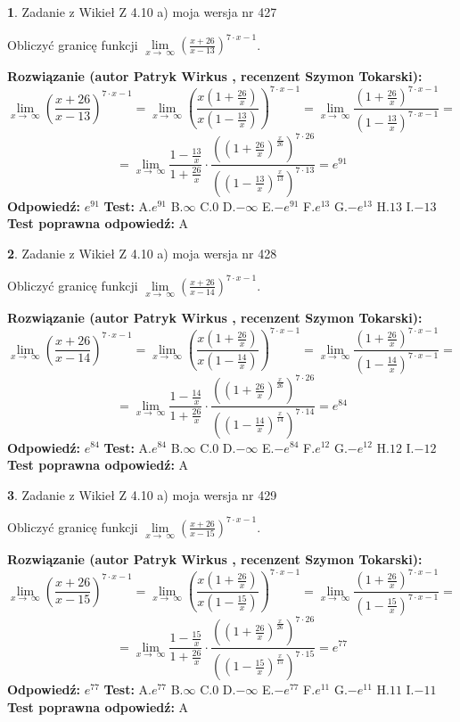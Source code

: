 \documentclass[12pt, a4paper]{article}
\theoremstyle{definition} %
\newtheorem{zad}{}
\newcommand{\zadStart}[1]{\begin{zad}#1\newline}
\newcommand{\zadStop}{\end{zad}}
\newcommand{\rozwStart}[2]{\noindent \textbf{Rozwiązanie (autor #1 , recenzent #2): }\newline}
\newcommand{\rozwStop}{\newline}
\newcommand{\odpStart}{\noindent \textbf{Odpowiedź:}\newline}
\newcommand{\odpStop}{\newline}
\newcommand{\testStart}{\noindent \textbf{Test:}\newline}
\newcommand{\testStop}{\newline}
\newcommand{\kluczStart}{\noindent \textbf{Test poprawna odpowiedź:}\newline}
\newcommand{\kluczStop}{\newline}
\begin{document}
\zadStart{Zadanie z Wikieł Z 4.10 a) moja wersja nr 427}

Obliczyć granicę funkcji  $\lim\limits_{x\to\ \infty}(\frac{x+26}{x-13})^{7\cdot x-1}$.
\zadStop
\rozwStart{Patryk Wirkus}{Szymon Tokarski}
$$\lim\limits_{x\to\ \infty}(\frac{x+26}{x-13})^{7\cdot x-1} = \lim\limits_{x\to\ \infty}(\frac{x(1+\frac{26}{x})}{x(1-\frac{13}{x})})^{7\cdot x-1}=\lim\limits_{x\to\ \infty}\frac{(1+\frac{26}{x})^{7\cdot x-1}}{(1-\frac{13}{x})^{7\cdot x-1}}=$$
$$=\lim\limits_{x\to\ \infty}\frac{1-\frac{13}{x}}{1+\frac{26}{x}}\cdot\frac{((1+\frac{26}{x})^{\frac{x}{26}})^{7\cdot26}}{((1-\frac{13}{x})^{\frac{x}{13}})^{7\cdot13}}=e^{91}$$
\rozwStop
\odpStart
$e^{91}$
\odpStop
\testStart
A.$e^{91}$ B.$\infty$ C.$0$ D.$-\infty$ E.$-e^{91}$
F.$e^{13}$ G.$-e^{13}$
H.$13$
I.$-13$
\testStop
\kluczStart
A
\kluczStop



\zadStart{Zadanie z Wikieł Z 4.10 a) moja wersja nr 428}

Obliczyć granicę funkcji  $\lim\limits_{x\to\ \infty}(\frac{x+26}{x-14})^{7\cdot x-1}$.
\zadStop
\rozwStart{Patryk Wirkus}{Szymon Tokarski}
$$\lim\limits_{x\to\ \infty}(\frac{x+26}{x-14})^{7\cdot x-1} = \lim\limits_{x\to\ \infty}(\frac{x(1+\frac{26}{x})}{x(1-\frac{14}{x})})^{7\cdot x-1}=\lim\limits_{x\to\ \infty}\frac{(1+\frac{26}{x})^{7\cdot x-1}}{(1-\frac{14}{x})^{7\cdot x-1}}=$$
$$=\lim\limits_{x\to\ \infty}\frac{1-\frac{14}{x}}{1+\frac{26}{x}}\cdot\frac{((1+\frac{26}{x})^{\frac{x}{26}})^{7\cdot26}}{((1-\frac{14}{x})^{\frac{x}{14}})^{7\cdot14}}=e^{84}$$
\rozwStop
\odpStart
$e^{84}$
\odpStop
\testStart
A.$e^{84}$ B.$\infty$ C.$0$ D.$-\infty$ E.$-e^{84}$
F.$e^{12}$ G.$-e^{12}$
H.$12$
I.$-12$
\testStop
\kluczStart
A
\kluczStop



\zadStart{Zadanie z Wikieł Z 4.10 a) moja wersja nr 429}

Obliczyć granicę funkcji  $\lim\limits_{x\to\ \infty}(\frac{x+26}{x-15})^{7\cdot x-1}$.
\zadStop
\rozwStart{Patryk Wirkus}{Szymon Tokarski}
$$\lim\limits_{x\to\ \infty}(\frac{x+26}{x-15})^{7\cdot x-1} = \lim\limits_{x\to\ \infty}(\frac{x(1+\frac{26}{x})}{x(1-\frac{15}{x})})^{7\cdot x-1}=\lim\limits_{x\to\ \infty}\frac{(1+\frac{26}{x})^{7\cdot x-1}}{(1-\frac{15}{x})^{7\cdot x-1}}=$$
$$=\lim\limits_{x\to\ \infty}\frac{1-\frac{15}{x}}{1+\frac{26}{x}}\cdot\frac{((1+\frac{26}{x})^{\frac{x}{26}})^{7\cdot26}}{((1-\frac{15}{x})^{\frac{x}{15}})^{7\cdot15}}=e^{77}$$
\rozwStop
\odpStart
$e^{77}$
\odpStop
\testStart
A.$e^{77}$ B.$\infty$ C.$0$ D.$-\infty$ E.$-e^{77}$
F.$e^{11}$ G.$-e^{11}$
H.$11$
I.$-11$
\testStop
\kluczStart
A
\kluczStop
\end{document}
